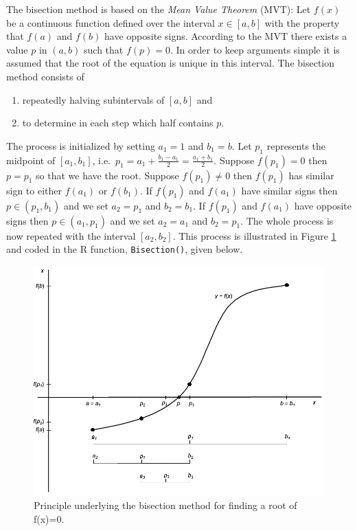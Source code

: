 \documentclass[
]{book}
\providecommand{\tightlist}{%
  \setlength{\itemsep}{0pt}\setlength{\parskip}{0pt}}
\begin{document}
The bisection method is based on the \emph{{Mean Value Theorem}} (MVT): Let \(f(x)\) be a continuous function defined over the interval \(x∈[a,b]\) with the property that \(f(a)\) and \(f(b)\) have opposite signs. According to the MVT there exists a value \(p\) in \((a,b)\) such that \(f(p)=0\). In order to keep arguments simple it is assumed that the root of the equation is unique in this interval. The bisection method consists of

\begin{enumerate}
\def\labelenumi{(\roman{enumi})}
\tightlist
\item
  repeatedly halving subintervals of \([a,b]\) and
\item
  to determine in each step which half contains \(p\).
\end{enumerate}

The process is initialized by setting \(a_1=1\) and \(b_1=b\). Let \(p_1\) represents the midpoint of \([a_1,b_1 ]\), i.e.~\(p_1 = a_1 + \frac{b_1 - a_1}{2} = \frac{a_1 + b_1}{2}\). Suppose \(f(p_1 )=0\) then \(p=p_1\) so that we have the root. Suppose \(f(p_1) \neq 0\) then \(f(p_1)\) has similar sign to either \(f(a_1)\) or \(f(b_1)\). If \(f(p_1)\) and \(f(a_1)\) have similar signs then \(p∈(p_1,b_1)\) and we set \(a_2=p_1\) and \(b_2=b_1\). If \(f(p_1)\) and \(f(a_1)\) have opposite signs then \(p∈(a_1,p_1)\) and we set \(a_2=a_1\) and \(b_2=p_1\). The whole process is now repeated with the interval \([a_2,b_2]\). This process is illustrated in Figure \ref{fig:bisection} and coded in the R function, \texttt{Bisection()}, given below.

\begin{figure}
\includegraphics[width=1\linewidth]{pics/bisection} \caption{Principle underlying the bisection method for finding a root of f(x)=0.}\label{fig:bisection}
\end{figure}
\end{document}
